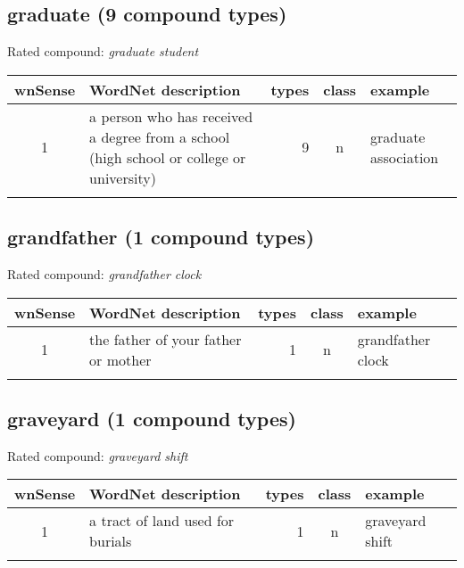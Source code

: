 
\subsection{graduate    (9 compound types)}
Rated compound: \emph{graduate student}


\vspace*{1ex}

\noindent
\begin{longtable}{c>{\raggedright\arraybackslash}p{5cm}rc>{\raggedright\arraybackslash}p{2cm}}\lsptoprule
{\small wnSense}&WordNet description&types&class&example\\\midrule
1&a person who has received a degree from a school (high school or college or university)&9&n& graduate association\\\lspbottomrule
\end{longtable}


\subsection{grandfather  (1 compound types)}
Rated compound: \emph{grandfather clock}


\vspace*{1ex}

\noindent
\begin{longtable}{c>{\raggedright\arraybackslash}p{5cm}rc>{\raggedright\arraybackslash}p{2cm}}\lsptoprule
{\small wnSense}&WordNet description&types&class&example\\\midrule
1&the father of your father or mother&1&n&grandfather clock\\\lspbottomrule
\end{longtable}

\subsection{graveyard (1 compound types)}
Rated compound: \emph{graveyard shift}

\vspace*{1ex}

\noindent
\begin{longtable}{c>{\raggedright\arraybackslash}p{5cm}rc>{\raggedright\arraybackslash}p{2cm}}\lsptoprule
{\small wnSense}&WordNet description&types&class&example\\\midrule
1&a tract of land used for burials&1&n&graveyard shift\\\lspbottomrule
\end{longtable}

